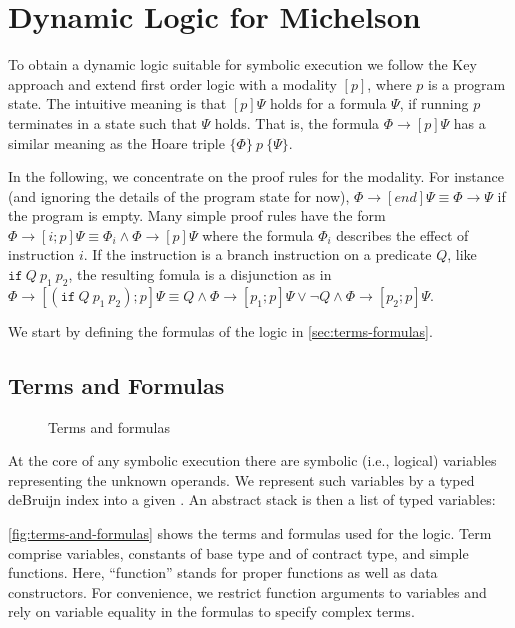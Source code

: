 \section{Dynamic Logic for Michelson}
\label{sec:DL}

To obtain a dynamic logic suitable for symbolic execution we follow
the Key approach \cite{KeY3} and extend
first order logic with a modality $[p]$, where $p$ is a program state. The
intuitive meaning is that $[p]\Psi$ holds for a formula $\Psi$, if
running $p$ terminates in a state such that $\Psi$ holds. That is, the
formula $\Phi \to [p]\Psi$ has a similar meaning as the Hoare triple
$\{\Phi\}~p~\{ \Psi\}$.

In the following, we concentrate on the proof rules for the
modality. For instance (and ignoring the details of the program state
for now), $\Phi \to [end]\Psi \equiv \Phi \to \Psi$ if the program is
empty. Many simple proof rules have the form $\Phi \to [i; p]\Psi \equiv \Phi_i
\wedge\Phi \to  [p]\Psi$ where the formula $\Phi_i$ describes the effect of
instruction $i$. If the instruction is a branch instruction on a
predicate $Q$, like $\mathtt{if}~Q~p_1~p_2$, the resulting fomula is a
disjunction as in $\Phi \to [(\mathtt{if}~Q~p_1~p_2); p]\Psi \equiv Q
\wedge \Phi \to [p_1; p]\Psi \vee \neg Q \wedge \Phi \to  [p_2; p]\Psi$.

We start by defining the formulas of the logic in \autoref{sec:terms-formulas}.

\subsection{Terms and Formulas}\label{sec:terms-formulas}
\begin{figure}[tp]
  \AbstractTerm
  \AbstractFormula
  \caption{Terms and formulas}
  \label{fig:terms-and-formulas}
\end{figure}

At the core of any symbolic execution there are symbolic (i.e., logical) variables
representing the unknown operands.
We represent such variables by a typed deBruijn index into a given
{\AbstractContext}.
An abstract stack is then a list of typed variables:
\AbstractMatch

\autoref{fig:terms-and-formulas} shows the terms and formulas used for the logic.
Term comprise variables, constants of base type and of contract type,
and simple functions. Here, ``function'' stands for proper functions as
well as data constructors. For convenience, we restrict function arguments
to variables and rely on variable equality in the formulas to specify
complex terms. 

